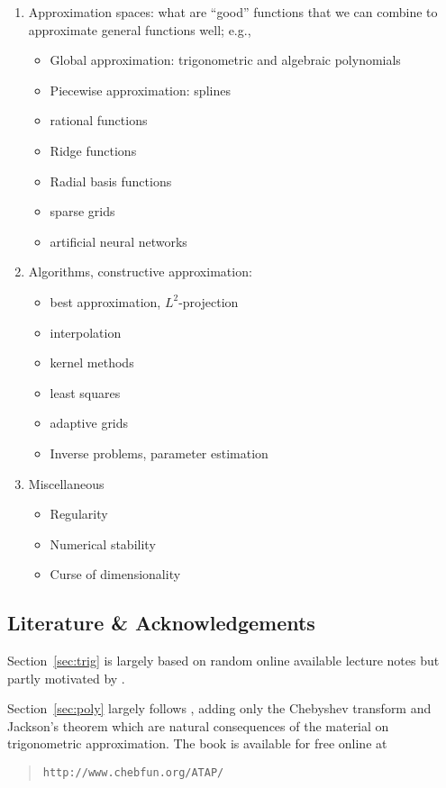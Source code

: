 \bigskip {}
\begin{enumerate}
\item Approximation spaces: what are ``good'' functions that we can combine
    to approximate general functions well; e.g., 
  \begin{itemize}
    \item Global approximation: trigonometric and algebraic  polynomials
    \item Piecewise approximation: splines
    \item rational functions 
    \item Ridge functions
    \item Radial basis functions
    \item sparse grids
    \item artificial neural networks 
  \end{itemize}

\item Algorithms, constructive approximation:
  \begin{itemize}
    \item best approximation, $L^2$-projection
    \item interpolation
    \item kernel methods
    \item least squares
    \item adaptive grids
    \item Inverse problems, parameter estimation
  \end{itemize}

\item Miscellaneous
  \begin{itemize}
    \item Regularity
    \item Numerical stability
    \item Curse of dimensionality
  \end{itemize}
\end{enumerate}


\subsection{Literature \& Acknowledgements}
%
\label{sec:acknowledgements}
%
Section~\ref{sec:trig} is largely based on random online available lecture notes
but partly motivated by \cite{Trefethen2000-fr,Trefethen2013-rg}.

Section~\ref{sec:poly} largely follows \cite{Trefethen2013-rg}, adding only the
Chebyshev transform and Jackson's theorem which are natural consequences of the
material on trigonometric approximation. The book \cite{Trefethen2013-rg} is
available for free online at 
\begin{quote}
  {\tt http://www.chebfun.org/ATAP/}
\end{quote}

